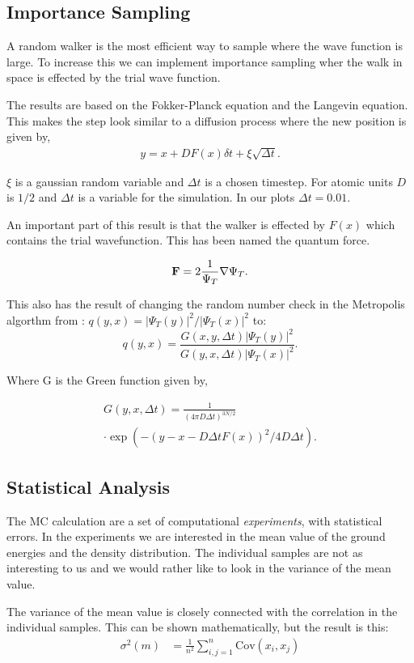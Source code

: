 \documentclass[twocolumn]{article}[10pt]
\newcommand{\eq}[1]{\begin{align*}#1\end{align*}}
\renewcommand\vec[1]{{\bf #1}}
\begin{document}
\subsection{Importance Sampling}
A random walker is the most efficient way to sample where the
wave function is large. To increase this we can implement importance
sampling wher the walk in space is effected by the trial wave function. 

The results are based on the Fokker-Planck equation and the Langevin 
equation. This makes the step look similar to a diffusion process
where the new position is given by,
\begin{align*}
y = x + DF(x) \delta t + \xi \sqrt{\Delta t}.
\end{align*}

$\xi $ is a gaussian random variable and $\Delta t$ is a chosen timestep.
For atomic units $D$ is $1/2$ and $\Delta t$ is a variable for the 
simulation. In our plots $\Delta t = 0.01$. 

An important part of this result is that the walker is effected by $F(x)$
which contains the trial wavefunction. This has been named the quantum 
force. 

\begin{align*}
\vec F = 2\frac{1}{\Psi_T}\nabla \Psi_T. 
\end{align*}

This also has the result of changing the random number check in the 
Metropolis algorthm from :
$q(y,x) = |\Psi_T(y)|^2/|\Psi_T(x)|^2$ to: 
\[
q(y,x) = \frac{G(x,y,\Delta t)|\Psi_T(y)|^2}{G(y,x,\Delta t)|\Psi_T(x)|^2}.
\]

Where G is the Green function given by,

\eq{
  G(y,x,\Delta t) =  \frac{1}{(4\pi D\Delta t)^{3N/2}}\\ \cdot \exp{\left(-(y-x-D\Delta t F(x))^2/4D\Delta t\right)}.
}

\subsection{Statistical Analysis}
The MC calculation are a set of computational \textit{experiments}, 
with statistical errors. In the experiments we are interested in the mean
value of the ground energies and the density distribution. The 
individual samples are not as interesting to us and we would rather like
to look in the variance of the mean value. 

	The variance of the mean value is closely connected with the correlation
in the individual samples. This can be shown mathematically, but the result
is this:
\eq{
\sigma^2(m) &= \frac{1}{n^2}\sum_{i,j=1}^{n} \mathrm{Cov}(x_i,x_j)
}
\end{document}
